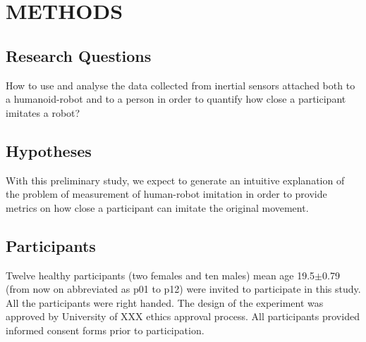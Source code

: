 \documentclass{sig-alternate-05-2015}
\begin{document}
% 
% 
% 







\section{METHODS}

\subsection{Research Questions}

How to use and analyse the data collected from inertial sensors attached both 
to a humanoid-robot and to a person in order to quantify how close a participant 
imitates a robot?


\subsection{Hypotheses}
With this preliminary study, we expect to generate an intuitive 
explanation of the problem of measurement of human-robot imitation 
in order to provide metrics on how close a participant can imitate the original
movement.



\subsection{Participants}
Twelve healthy participants (two females and ten males)
mean age 19.5$\pm$0.79 (from now on abbreviated as p01 to p12) were invited to 
participate in this study. All the participants were right handed.
The design of the experiment was approved by University of XXX ethics approval
process. All participants provided informed consent forms prior to participation.
\end{document}
